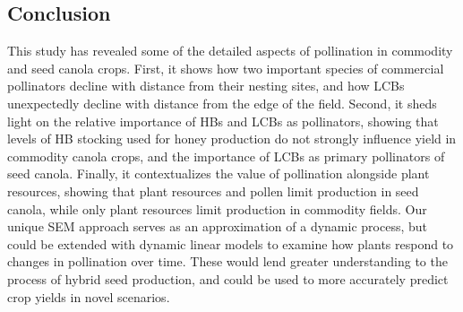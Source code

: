 \documentclass[12pt]{article} %
\begin{document}
\subsection*{Conclusion} 

This study has revealed some of the detailed aspects of pollination in commodity and seed canola crops.
First, it shows how two important species of commercial pollinators decline with distance from their nesting sites, and how LCBs unexpectedly decline with distance from the edge of the field.
Second, it sheds light on the relative importance of HBs and LCBs as pollinators, showing that levels of HB stocking used for honey production do not strongly influence yield in commodity canola crops, and the importance of LCBs as primary pollinators of seed canola.
Finally, it contextualizes the value of pollination alongside plant resources, showing that plant resources and pollen limit production in seed canola, while only plant resources limit production in commodity fields.
Our unique SEM approach serves as an approximation of a dynamic process, but could be extended with dynamic linear models \citep{iwasa2000, nord2011, saez2018} to examine how plants respond to changes in pollination over time.
These would lend greater understanding to the process of hybrid seed production, and could be used to more accurately predict crop yields in novel scenarios.

\end{document}
